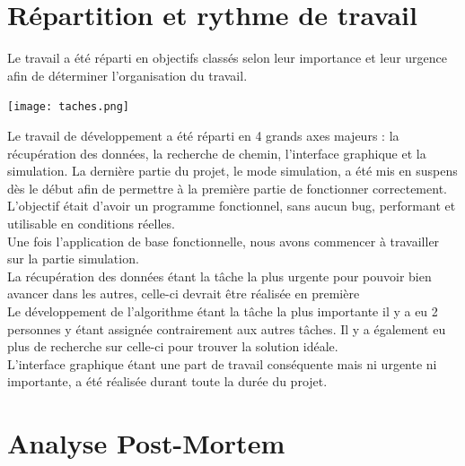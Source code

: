 \documentclass[12pt,titlepage]{report}
\begin{document}
\section{Répartition et rythme de travail}

Le travail a été réparti en objectifs classés selon leur importance et leur urgence afin de déterminer l'organisation du travail. \\

\begin{center}
\texttt{[image: taches.png]} \\    
\end{center}

Le travail de développement a été réparti en 4 grands axes majeurs : la récupération des données, la recherche de chemin, l'interface graphique et la simulation. La dernière partie du projet, le mode simulation, a été mis en suspens dès le début afin de permettre à la première partie de fonctionner correctement. L'objectif était d'avoir un programme fonctionnel, sans aucun bug, performant et utilisable en conditions réelles.  \\
Une fois l'application de base fonctionnelle, nous avons commencer à travailler sur la partie simulation.\\

La récupération des données étant la tâche la plus urgente pour pouvoir bien avancer dans les autres, celle-ci devrait être réalisée en première  \\
Le développement de l'algorithme étant la tâche la plus importante il y a eu  2 personnes y étant assignée contrairement aux autres tâches. Il y a également eu plus de recherche sur celle-ci pour trouver la solution idéale. \\
L'interface graphique étant une part de travail conséquente mais ni urgente ni importante, a été réalisée durant toute la durée du projet. \\

\section{Analyse Post-Mortem}
\end{document}
